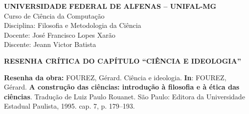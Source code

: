 \documentclass[12pt,a4paper]{article}
\begin{document}
\begin{singlespace}
\begin{center}
  \textbf{UNIVERSIDADE FEDERAL DE ALFENAS -- UNIFAL-MG}\\
  Curso de Ciência da Computação\\
  Disciplina: Filosofia e Metodologia da Ciência\\
  Docente: José Francisco Lopes Xarão\\
  Discente: Jeann Victor Batista

  \vspace{0.8cm}

  {\bfseries\large RESENHA CRÍTICA DO CAPÍTULO ``CIÊNCIA E IDEOLOGIA''}
\end{center}

\vspace{0.5cm}

\noindent\textbf{Resenha da obra:} FOUREZ, Gérard. Ciência e ideologia.
\textbf{In}: FOUREZ, Gérard. \textbf{A construção das ciências: introdução à
filosofia e à ética das ciências}. Tradução de Luiz Paulo Rouanet. São Paulo:
Editora da Universidade Estadual Paulista, 1995. cap. 7, p. 179--193.
\end{singlespace}

\vspace{0.6cm}
\end{document}
